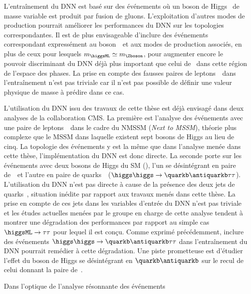 \par
L'entraînement du DNN est basé sur des événements
où un boson de Higgs \higgsML\ de masse variable est produit par fusion de gluons.
L'exploitation d'autres modes de production
pourrait améliorer les performances
du DNN sur les topologies correspondantes.
Il est de plus envisageable d'inclure
des événements correspondant expressément au boson~\Zboson\
et aux modes de production associés,
en plus de ceux pour lesquels $m_{\higgsML}\simeq m_{\Zboson}$,
pour augmenter encore le pouvoir discriminant du DNN
déjà plus important que celui de \mTtot\
dans cette région de l'espace des phases.
La prise en compte des fausses paires de leptons~\tau\
dans l'entraînement
n'est pas triviale
car il n'est pas possible de définir une valeur physique de masse à prédire
dans ce cas.
\par
L'utilisation du DNN issu des travaux de cette thèse
est déjà envisagé dans deux analyses de la collaboration CMS.
La première est l'analyse des événements avec une paire de leptons~\tau\
dans le cadre du NMSSM (\emph{Next to MSSM}),
théorie plus complexe que le MSSM dans laquelle existent sept bosons de Higgs au lieu de cinq.
La topologie des événements y est la même que dans l'analyse menée dans cette thèse,
l'implémentation du DNN est donc directe.
La seconde porte sur les événements avec deux bosons de Higgs du SM (\higgs),
l'un se désintégrant en paire de~\tau\
et l'autre en paire de quarks~\quarkb\
($\higgs\higgs\to\quarkb\antiquarkb\tau\tau$).
L'utilisation du DNN n'est pas directe à cause de la présence des deux jets de quarks~\quarkb,
situation inédite par rapport aux travaux menés dans cette thèse.
La prise en compte de ces jets dans les variables d'entrée du DNN n'est pas triviale
et
les études actuelles menées par le groupe en charge de cette analyse
tendent à montrer une dégradation des performances par rapport au simple cas $\higgsML\to\tau\tau$
pour lequel il est conçu.
Comme exprimé précédemment,
inclure des événements $\higgs\higgs\to\quarkb\antiquarkb\tau\tau$
dans l'entraînement du DNN pourrait remédier à cette dégradation.
Une piste prometteuse est d'étudier l'effet du boson de Higgs se désintégrant en $\quarkb\antiquarkb$ sur le recul de celui donnant la paire de~\tau.
\par
Dans l'optique de l'analyse \og résonnante \fg{} des événements

